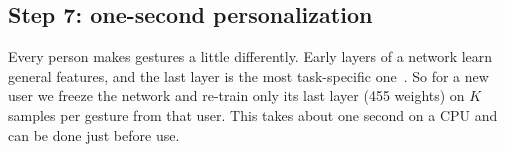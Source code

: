 \subsection{Step 7: one-second personalization}
\label{sec:personal}
Every person makes gestures a little differently. Early layers of a network
learn general features, and the last layer is the most task-specific
one~\cite{yosinski2014transferable}. So for a new user we freeze the network and
re-train only its last layer (455 weights) on $K$ samples per gesture from that
user. This takes about one second on a CPU and can be done just before use.
